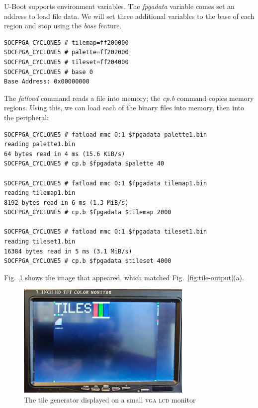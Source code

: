 \documentclass[11pt]{article}
\newcommand{\figref}[1]{Fig.~\ref{fig:#1}}
\begin{document}
U-Boot supports environment variables.  The \emph{fpgadata} variable
comes set an address to load file data.  We will set three additional
variables to the base of each region and stop using the \emph{base}
feature.

{\footnotesize
\begin{verbatim}
SOCFPGA_CYCLONE5 # tilemap=ff200000
SOCFPGA_CYCLONE5 # palette=ff202000
SOCFPGA_CYCLONE5 # tileset=ff204000
SOCFPGA_CYCLONE5 # base 0
Base Address: 0x00000000
\end{verbatim}
}

The \emph{fatload} command reads a file into memory; the \emph{cp.b}
command copies memory regions.  Using this, we can load each of the
binary files into memory, then into the peripheral:

{\footnotesize
\begin{verbatim}
SOCFPGA_CYCLONE5 # fatload mmc 0:1 $fpgadata palette1.bin 
reading palette1.bin
64 bytes read in 4 ms (15.6 KiB/s)
SOCFPGA_CYCLONE5 # cp.b $fpgadata $palette 40

SOCFPGA_CYCLONE5 # fatload mmc 0:1 $fpgadata tilemap1.bin
reading tilemap1.bin
8192 bytes read in 6 ms (1.3 MiB/s)
SOCFPGA_CYCLONE5 # cp.b $fpgadata $tilemap 2000

SOCFPGA_CYCLONE5 # fatload mmc 0:1 $fpgadata tileset1.bin
reading tileset1.bin
16384 bytes read in 5 ms (3.1 MiB/s)
SOCFPGA_CYCLONE5 # cp.b $fpgadata $tileset 4000
\end{verbatim}
}

\figref{screenshot} shows the image that appeared, which matched
\figref{tile-output}(a).

\begin{figure}
  \centerline{\includegraphics[width=0.75\textwidth]{screenshot.jpg}}
  \caption{The tile generator displayed on a small \textsc{vga} \textsc{lcd} monitor}
  \label{fig:screenshot}
\end{figure}
\end{document}
